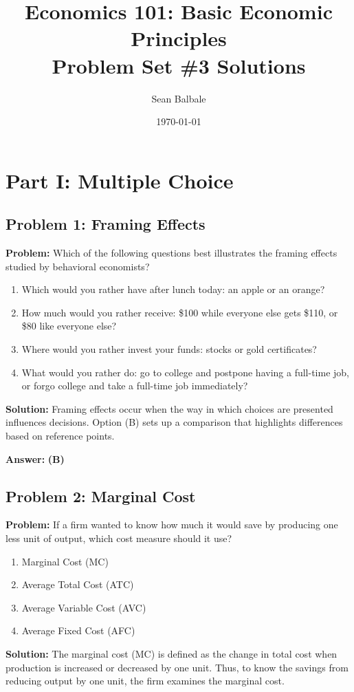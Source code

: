 \documentclass[12pt]{article}
\title{Economics 101: Basic Economic Principles\\Problem Set \#3 Solutions}
\author{Sean Balbale}
\date{\today}
\begin{document}
\maketitle

\section*{Part I: Multiple Choice}

\subsection*{Problem 1: Framing Effects}
\textbf{Problem:} Which of the following questions best illustrates the framing effects studied by behavioral economists?
\begin{enumerate}[label=(\Alph*)]
  \item Which would you rather have after lunch today: an apple or an orange?
  \item How much would you rather receive: \$100 while everyone else gets \$110, or \$80 like everyone else?
  \item Where would you rather invest your funds: stocks or gold certificates?
  \item What would you rather do: go to college and postpone having a full-time job, or forgo college and take a full-time job immediately?
\end{enumerate}
\textbf{Solution:} Framing effects occur when the way in which choices are presented influences decisions. Option (B) sets up a comparison that highlights differences based on reference points.
\medskip

\textbf{Answer:} \textbf{(B)}

\subsection*{Problem 2: Marginal Cost}
\textbf{Problem:} If a firm wanted to know how much it would save by producing one less unit of output, which cost measure should it use?
\begin{enumerate}[label=(\Alph*)]
  \item Marginal Cost (MC)
  \item Average Total Cost (ATC)
  \item Average Variable Cost (AVC)
  \item Average Fixed Cost (AFC)
\end{enumerate}
\textbf{Solution:} The marginal cost (MC) is defined as the change in total cost when production is increased or decreased by one unit. Thus, to know the savings from reducing output by one unit, the firm examines the marginal cost.
\medskip
\end{document}

